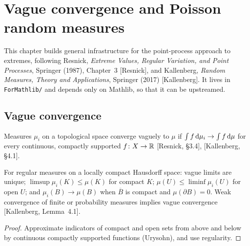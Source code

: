 \chapter{Vague convergence and Poisson random measures}
\label{chap:point-processes}

This chapter builds general infrastructure for the point-process approach to extremes, following
Resnick, \emph{Extreme Values, Regular Variation, and Point Processes}, Springer (1987),
Chapter~3 [Resnick], and Kallenberg, \emph{Random Measures, Theory and Applications}, Springer
(2017) [Kallenberg]. It lives in \texttt{ForMathlib/} and depends only on Mathlib, so that it can
be upstreamed.

\section{Vague convergence}

\begin{definition}
  \label{def:vague}
  \leanok
  Measures $\mu_i$ on a topological space converge vaguely to $\mu$ if
  $\int f \, \mathrm{d}\mu_i \to \int f \, \mathrm{d}\mu$ for every continuous, compactly supported
  $f \colon X \to \mathbb{R}$ [Resnick, \S3.4], [Kallenberg, \S4.1].
\end{definition}

\begin{theorem}
  \label{thm:vague-portmanteau}
  \leanok
  For regular measures on a locally compact Hausdorff space: vague limits are unique;
  $\limsup \mu_i(K) \le \mu(K)$ for compact $K$; $\mu(U) \le \liminf \mu_i(U)$ for open $U$; and
  $\mu_i(B) \to \mu(B)$ when $\overline B$ is compact and $\mu(\partial B) = 0$. Weak convergence of
  finite or probability measures implies vague convergence [Kallenberg, Lemma~4.1].
\end{theorem}
\begin{proof}
  \leanok
  Approximate indicators of compact and open sets from above and below by continuous compactly
  supported functions (Urysohn), and use regularity.
\end{proof}

